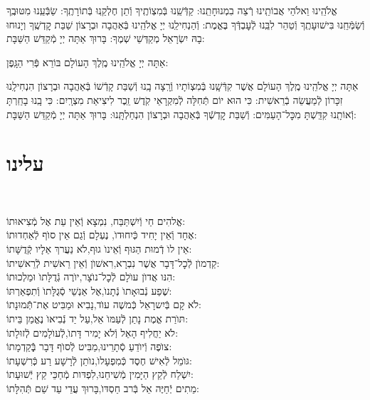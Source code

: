 \documentclass[twoside, openany, parskip=half, 11pt]{book}
\begin{document}
 אֱלֹהֵֽינוּ וֵאלֹהֵי אֲבוֹתֵֽינוּ רְֿצֵה בִמְנוּחָתֵֽנוּ: קַדְּֿשֵֽׁנוּ בְּֿמִצְוֹתֶֽיךָ וְֿתֵן חֶלְקֵֽנוּ בְּֿתוֹרָתֶֽךָ: שַׂבְּֿעֵֽנוּ מִטּוּבֶֽךָ וְֿשַׂמְּֿחֵֽנוּ בִּישׁוּעָתֶֽךָ וְֿטַהֵר לִבֵּֽנוּ לְֿעׇבְדְּֿךָ בֶּאֱמֶת: וְֿהַנְחִילֵֽנוּ יְיָ אֱלֹהֵֽינוּ בְּֿאַהֲבָה וּבְרָצוֹן שַׁבַּת קׇדְשֶֽׁךָ וְיָנוּחוּ בָהּ יִשְׂרָאֵל מְקַדְּשֵׁי שְׁמֶךָ: בָּרוּךְ אַתָּה יְיָ מְֿקַדֵּשׁ הַשַּׁבָּת:

\fullkaddish
\nextpage
{}

אַתָּה יְיָ אֱלֹהֵֽינוּ מֶֽלֶךְ הָעוֹלָם בּוֹרֵא פְּֿרִי הַגָּֽפֶן:

אַתָּה יְיָ אֱלֹהֵֽינוּ מֶֽלֶךְ הָעוֹלָם אֲשֶׁר קִדְּֿשָֽׁנוּ בְּֿמִצְוֹתָיו וְֿרָֽצָה בָֽנוּ וְֿשַׁבַּת קָדְֿשׁוֹ בְּֿאַהֲבָה וּבְרָצוֹן הִנְחִילָֽנוּ זִכָּרוֹן לְֿמַעֲשֵׂה בְֿרֵאשִׁית: כִּי הוּא יוֹם תְּֿחִלָּה לְֿמִקְרָאֵי קֹֽדֶשׁ זֵֽכֶר לִיצִיאַת מִצְרָֽיִם: כִּי בָֽנוּ בָחַֽרְתָּ וְֿאוֹתָֽנוּ קִדַּֽשְׁתָּ מִכׇּל־הָעַמִּים: וְֿשַׁבַּת קׇדְשְֿׁךָ בְּֿאַהֲבָה וּבְרָצוֹן הִנְחַלְתָּֽנוּ: בָּרוּךְ אַתָּה יְיָ מְֿקַדֵּשׁ הַשַּׁבָּת:



\section*{ עלינו }
\aleinu

\ledavid
\\
\mournerskaddish
\nextpage
{}



 אֱלהִים חַי וְֿיִשְׁתַּבַּח, \hfill נִמְצָא וְֿאֵין עֵת אֶל מְֿצִיאוּתוֹ: \\
אֶחָד וְֿאֵין יָחִיד כְּֿיִחוּדוׂ, \hfill נֶעְלָם וְֿגַם אֵין סוׂף לְֿאַחְדוּתוֹ: \\
 אֵין לוׂ דְֿמוּת הַגּוּף וְֿאֵינוׂ גוּף,\hfill לׂא נַעֲרךְ אֵלָיו קְֿדֻשָּׁתוֹ: \\
 קַדְמוׂן לְֿכׇל־דָּבָר אֲשֶׁר נִבְרָא,\hfill רִאשׁוׂן וְֿאֵין רֵאשִׁית לְֿרֵאשִׁיתוֹ: \\
 הִנּו אֲדוׂן עוׂלָם לְֿכׇל־נוׂצָר,\hfill יוׂרֶה גְֿדֻלָּתוׂ וּמַלְכוּתוֹ: \\
 שֶׁפַע נְֿבוּאָתוׂ נְֿתָנוׂ,\hfill אֶל אַנְשֵׁי סְֿגֻלָּתוׂ וְֿתִפְאַרְתּוֹ: \\
 לׂא קָם בְּֿיִשרָאֵל כְּֿמשֶׁה עוׂד,\hfill נָבִיא וּמַבִּיט אֶת־תְּֿֿמוּנָתוֹ: \\
 תּוׂרַת אֱמֶת נָתַן לְֿעַמּוׂ אֵל,\hfill עַל יַד נְֿבִיאוׂ נֶאֱמַן בֵּיתוֹ: \\
 לׂא יַחֲלִיף הָאֵל וְֿלׂא יָמִיר דָּתוׂ,\hfill לְֿעוׂלָמִים לְֿזוּלָתוֹ: \\
 צוׂפֶה וְֿיוׂדֵעַ סְֿתָרֵינוּ,\hfill מַבִּיט לְֿסוׂף דָּבָר בְְַּֿֿקַדְמָתוֹ: \\
 גּוׂמֵל לְֿאִישׁ חֶסֶד כְּֿמִפְעָלוׂ,\hfill נוׂתֵן לְֿרָשָׁע רַע כְּֿרִשְׁעָתוֹ: \\
 יִשְׁלַח לְֿקֵץ הַיָּמִין מְֿשִׁיחֵנוּ,\hfill לִפְדּות מְֿחַכֵּי קֵץ יְֿשׁוּעָתוֹ: \\
 מֵתִים יְֿחַיֶּה אֵל בְּֿרב חַסְדּוׂ,\hfill בָּרוּךְ עֲדֵי עַד שֵׁם תְּֿהִלָּתוֹ:\\
\end{document}
